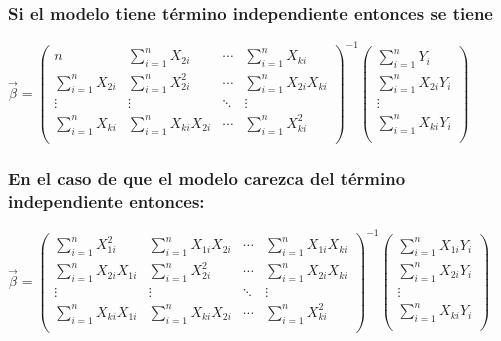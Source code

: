 \documentclass[a4paper,12pt]{article}
\begin{document}
\subsubsection*{Si el modelo tiene término independiente entonces se tiene}
$\vec{\beta} = \left( \begin{array}{cccc}
    n & \sum_{i=1}^{n} X_{2i} & \cdots & \sum_{i=1}^{n} X_{ki} \\
    \sum_{i=1}^{n} X_{2i} & \sum_{i=1}^{n} X_{2i}^2 & \cdots & \sum_{i=1}^{n} X_{2i}X_{ki} \\
    \vdots & \vdots & \ddots & \vdots \\
    \sum_{i=1}^{n} X_{ki} & \sum_{i=1}^{n} X_{ki}X_{2i} & \cdots & \sum_{i=1}^{n} X_{ki}^2 \\
    \end{array} \right)^{-1}
    \left( \begin{array}{c}
    \sum_{i=1}^{n} Y_{i} \\
    \sum_{i=1}^{n} X_{2i}Y_{i} \\
    \vdots \\
    \sum_{i=1}^{n} X_{ki}Y_{i} \\
\end{array} \right)$
    
    \subsubsection*{En el caso de que el modelo carezca del término independiente entonces:}
    $\vec{\beta} = \left( \begin{array}{cccc}
    \sum_{i=1}^{n} X_{1i}^2 & \sum_{i=1}^{n} X_{1i}X_{2i} & \cdots & \sum_{i=1}^{n} X_{1i}X_{ki} \\
    \sum_{i=1}^{n} X_{2i}X_{1i} & \sum_{i=1}^{n} X_{2i}^2 & \cdots & \sum_{i=1}^{n} X_{2i}X_{ki} \\
    \vdots & \vdots & \ddots & \vdots \\
    \sum_{i=1}^{n} X_{ki}X_{1i} & \sum_{i=1}^{n} X_{ki}X_{2i} & \cdots & \sum_{i=1}^{n} X_{ki}^2 \\
    \end{array} \right)^{-1}
    \left( \begin{array}{c}
    \sum_{i=1}^{n} X_{1i}Y_{i} \\
    \sum_{i=1}^{n} X_{2i}Y_{i} \\
    \vdots \\
    \sum_{i=1}^{n} X_{ki}Y_{i} \\
\end{array} \right)$
    
\end{document}
